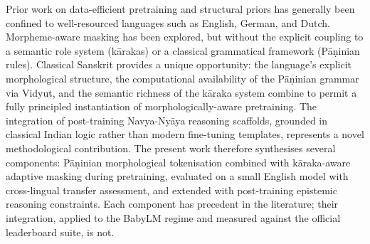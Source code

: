 Prior work on data-efficient pretraining and structural priors has generally been confined to well-resourced languages such as English, German, and Dutch. Morpheme-aware masking has been explored, but without the explicit coupling to a semantic role system (kārakas) or a classical grammatical framework (Pāṇinian rules). Classical Sanskrit provides a unique opportunity: the language's explicit morphological structure, the computational availability of the Pāṇinian grammar via Vidyut, and the semantic richness of the kāraka system combine to permit a fully principled instantiation of morphologically-aware pretraining. The integration of post-training Navya-Nyāya reasoning scaffolds, grounded in classical Indian logic rather than modern fine-tuning templates, represents a novel methodological contribution. The present work therefore synthesises several components: Pāṇinian morphological tokenisation combined with kāraka-aware adaptive masking during pretraining, evaluated on a small English model with cross-lingual transfer assessment, and extended with post-training epistemic reasoning constraints. Each component has precedent in the literature; their integration, applied to the BabyLM regime and measured against the official leaderboard suite, is not.
